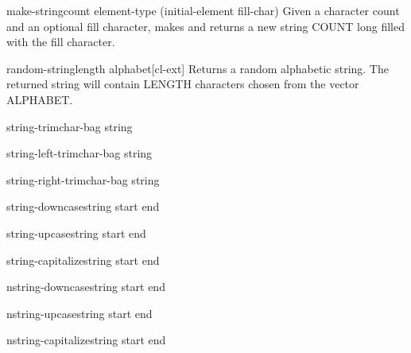 \documentclass[10pt,english]{book}
\begin{document}
\begin{function}{make-string}{count \key element-type (initial-element fill-char)}
  Given a character count and an optional fill character, makes and returns a
new string COUNT long filled with the fill character.
\end{function}

\begin{function}{random-string}{\op length alphabet}[cl-ext]
  Returns a random alphabetic string. The returned string will contain
  LENGTH characters chosen from the vector ALPHABET.
\end{function}

\begin{function}{string-trim}{char-bag string}
  
\end{function}

\begin{function}{string-left-trim}{char-bag string}
  
\end{function}

\begin{function}{string-right-trim}{char-bag string}
  
\end{function}

\begin{function}{string-downcase}{string \key start end}
  
\end{function}

\begin{function}{string-upcase}{string \key start end}
  
\end{function}

\begin{function}{string-capitalize}{string \key start end}
  
\end{function}

\begin{function}{nstring-downcase}{string \key start end}
  
\end{function}

\begin{function}{nstring-upcase}{string \key start end}
  
\end{function}

\begin{function}{nstring-capitalize}{string \key start end}
  
\end{function}
\end{document}
